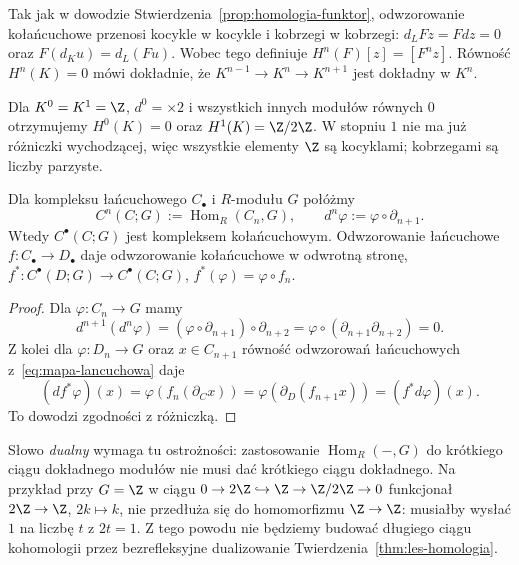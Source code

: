 Tak jak w dowodzie
Stwierdzenia~\ref{prop:homologia-funktor},
odwzorowanie kołańcuchowe przenosi kocykle w
kocykle i kobrzegi w kobrzegi:
$d_LFz=Fdz=0$ oraz
$F(d_Ku)=d_L(Fu)$. Wobec tego definiuje
$H^n(F)[z]=[F^nz]$. Równość
$H^n(K)=0$ mówi dokładnie, że
$K^{n-1}\to K^n\to K^{n+1}$
jest dokładny w $K^n$.

\begin{przyklad}
Dla $K^0=K^1=\Z$, $d^0=\times2$
i wszystkich innych modułów równych $0$
otrzymujemy $H^0(K)=0$ oraz
$H^1(K)=\Z/2\Z$. W stopniu $1$ nie ma
już różniczki wychodzącej, więc
wszystkie elementy $\Z$ są kocyklami;
kobrzegami są liczby parzyste.
\end{przyklad}

\begin{stwierdzenie}
\label{prop:kompleks-dualny}
Dla kompleksu łańcuchowego $C_\bullet$
i $R$-modułu $G$ połóżmy
\[
 C^n(C;G):=\operatorname{Hom}_R(C_n,G),
 \qquad d^n\varphi:=\varphi\circ \partial_{n+1}.
\]
Wtedy $C^\bullet(C;G)$ jest kompleksem
kołańcuchowym. Odwzorowanie łańcuchowe
$f:C_\bullet\to D_\bullet$ daje odwzorowanie
kołańcuchowe w odwrotną stronę,
$f^*:C^\bullet(D;G)\to C^\bullet(C;G)$,
$f^*(\varphi)=\varphi\circ f_n$.
\end{stwierdzenie}
\begin{proof}
Dla $\varphi:C_n\to G$ mamy
\[
 d^{n+1}(d^n\varphi)
 =(\varphi\circ \partial_{n+1})\circ \partial_{n+2}
 =\varphi\circ(\partial_{n+1}\partial_{n+2})=0.
\]
Z kolei dla $\varphi:D_n\to G$
oraz $x\in C_{n+1}$ równość odwzorowań łańcuchowych
z~\eqref{eq:mapa-lancuchowa} daje
\[
 (d f^*\varphi)(x)
 =\varphi(f_n(\partial_C x))
 =\varphi(\partial_D(f_{n+1}x))
 =(f^*d\varphi)(x).
\]
To dowodzi zgodności z różniczką.
\end{proof}

Słowo \emph{dualny} wymaga tu ostrożności:
zastosowanie $\operatorname{Hom}_R(-,G)$
do krótkiego ciągu dokładnego modułów
nie musi dać krótkiego ciągu dokładnego.
Na przykład przy $G=\Z$ w ciągu
$0\to2\Z\hookrightarrow\Z\to\Z/2\Z\to0$
funkcjonał $2\Z\to\Z$, $2k\mapsto k$,
nie przedłuża się do homomorfizmu
$\Z\to\Z$: musiałby wysłać $1$
na liczbę $t$ z $2t=1$.
Z tego powodu nie będziemy budować
długiego ciągu kohomologii przez
bezrefleksyjne dualizowanie
Twierdzenia~\ref{thm:les-homologia}.

